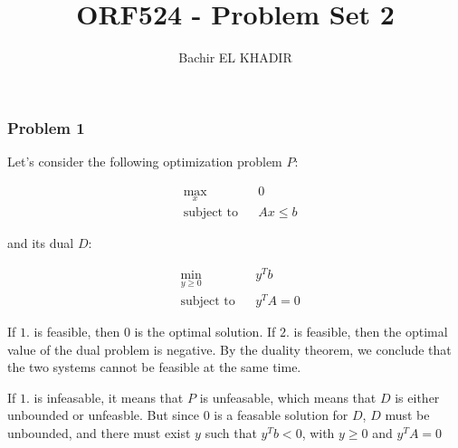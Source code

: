 \documentclass[12pt]{article}
\title{ORF524 - Problem Set 2}
\author{Bachir EL KHADIR }
\newcommand{\Q}[1]{\subsubsection*{Problem #1}}
\newcommand{\optimize}[4]
{
\begin{align*}
& \underset{#1}{\text{#4}}
& & #2 \\
& \text{subject to}
& & #3
\end{align*}
}
\newcommand{\minimize}[3]{\optimize{#1}{#2}{#3}{min}}
\newcommand{\maximize}[3]{\optimize{#1}{#2}{#3}{max}}
\begin{document}
\maketitle

\Q{1}

Let's consider the following optimization problem $P$:
\maximize{x}{0}{Ax \leq b}
and its dual $D$:
\minimize{y \geq 0}{y^T b}{y^TA = 0}

If $1.$ is feasible, then $0$ is the optimal solution. If $2.$ is feasible, then the optimal value of the dual problem is negative. By the duality theorem, we conclude that the two systems cannot be feasible at the same time.


If $1.$ is infeasable, it means that $P$ is unfeasable, which means that $D$ is either unbounded or unfeasble. But since $0$ is a feasable solution for $D$, $D$ must be unbounded, and there must exist $y$ such that $y^Tb < 0$, with $y \geq 0$ and $y^T A = 0$
\end{document}
